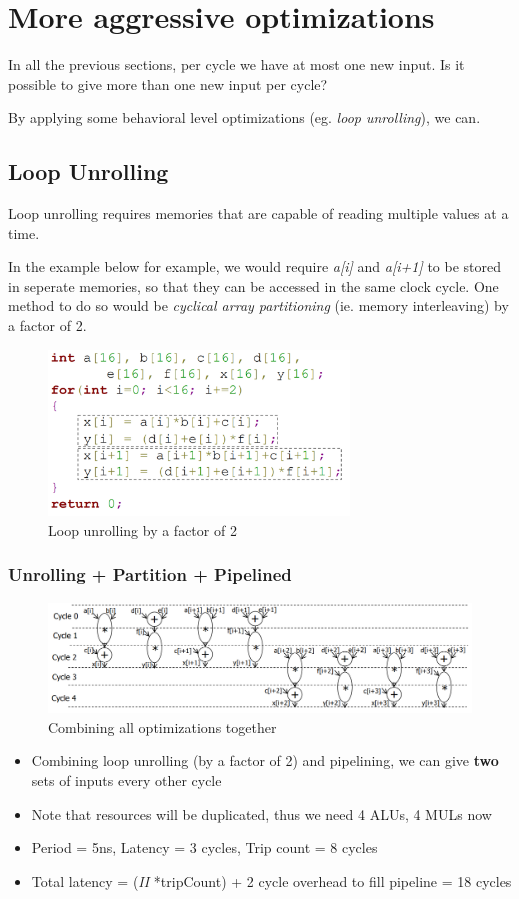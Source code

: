 \documentclass{article}
\begin{document}
\section{More aggressive optimizations}
In all the previous sections, per cycle we have at most one new input.
Is it possible to give more than one new input per cycle?

By applying some behavioral level optimizations (eg. \textit{loop unrolling}), we can.

\subsection{Loop Unrolling}
Loop unrolling requires memories that are capable of reading multiple values at a time.

In the example below for example, we would require \textit{a[i]} and \textit{a[i+1]} to be stored in seperate memories, so that they can be accessed in the same clock cycle.
One method to do so would be \textit{cyclical array partitioning} (ie. memory interleaving) by a factor of 2.

\begin{figure}[htp]
    \centering
    \includegraphics[width=8cm, scale=1]{S3/loopUnrolling.PNG}
    \caption{Loop unrolling by a factor of 2}
\end{figure}

\subsubsection{Unrolling + Partition + Pipelined}
\begin{figure}[htp]
    \centering
    \includegraphics[width=14cm, scale=1]{S3/unrollPipelinePartition.PNG}
    \caption{Combining all optimizations together}
\end{figure}

\begin{itemize}
    \item Combining loop unrolling (by a factor of 2) and pipelining, we can give \textbf{two} sets of inputs every other cycle
    \item Note that resources will be duplicated, thus we need 4 ALUs, 4 MULs now
    \item Period = 5ns, Latency = 3 cycles, Trip count = 8 cycles
    \item Total latency = (\textit{II} *tripCount) + 2 cycle overhead to fill pipeline = 18 cycles
\end{itemize}
\end{document}
